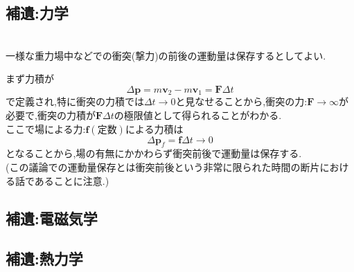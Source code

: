 \documentclass[dvipdfmx,uplatex]{jsarticle}
\begin{document}
\subsection{補遺:力学}
\begin{theo}[場中の運動量保存]\mbox{} \\
一様な重力場中などでの衝突(撃力)の前後の運動量は保存するとしてよい.
\end{theo}
まず力積が
\[
\Delta \bm{p} = m \bm{v}_2 - m \bm{v}_1 = \bm{F} \Delta t
\]
で定義され,特に衝突の力積では$\Delta t \rightarrow 0$と見なせることから,衝突の力:$\bm{F} \rightarrow \infty$が必要で,衝突の力積が$\bm{F} \Delta t$の極限値として得られることがわかる. \\
ここで場による力:$\bm{f}(定数)$による力積は
\[
\Delta \bm{p}_f = \bm{f} \Delta t \to 0
\]
となることから,場の有無にかかわらず衝突前後で運動量は保存する. \\
(この議論での運動量保存とは衝突前後という非常に限られた時間の断片における話であることに注意.)

\subsection{補遺:電磁気学}

\subsection{補遺:熱力学}
\end{document}
